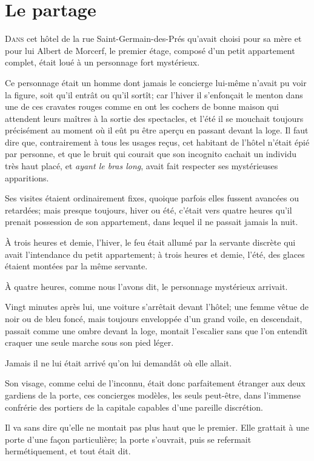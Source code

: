 \chapter{Le partage}

\lettrine{D}{ans} cet hôtel de la rue Saint-Germain-des-Prés qu'avait choisi pour sa mère et pour lui Albert de Morcerf, le premier étage, composé d'un petit appartement complet, était loué à un personnage fort mystérieux. 

Ce personnage était un homme dont jamais le concierge lui-même n'avait pu voir la figure, soit qu'il entrât ou qu'il sortît; car l'hiver il s'enfonçait le menton dans une de ces cravates rouges comme en ont les cochers de bonne maison qui attendent leurs maîtres à la sortie des spectacles, et l'été il se mouchait toujours précisément au moment où il eût pu être aperçu en passant devant la loge. Il faut dire que, contrairement à tous les usages reçus, cet habitant de l'hôtel n'était épié par personne, et que le bruit qui courait que son incognito cachait un individu très haut placé, et \textit{ayant le bras long}, avait fait respecter ses mystérieuses apparitions. 

Ses visites étaient ordinairement fixes, quoique parfois elles fussent avancées ou retardées; mais presque toujours, hiver ou été, c'était vers quatre heures qu'il prenait possession de son appartement, dans lequel il ne passait jamais la nuit. 

À trois heures et demie, l'hiver, le feu était allumé par la servante discrète qui avait l'intendance du petit appartement; à trois heures et demie, l'été, des glaces étaient montées par la même servante. 

À quatre heures, comme nous l'avons dit, le personnage mystérieux arrivait. 

Vingt minutes après lui, une voiture s'arrêtait devant l'hôtel; une femme vêtue de noir ou de bleu foncé, mais toujours enveloppée d'un grand voile, en descendait, passait comme une ombre devant la loge, montait l'escalier sans que l'on entendît craquer une seule marche sous son pied léger. 

Jamais il ne lui était arrivé qu'on lui demandât où elle allait. 

Son visage, comme celui de l'inconnu, était donc parfaitement étranger aux deux gardiens de la porte, ces concierges modèles, les seuls peut-être, dans l'immense confrérie des portiers de la capitale capables d'une pareille discrétion. 

Il va sans dire qu'elle ne montait pas plus haut que le premier. Elle grattait à une porte d'une façon particulière; la porte s'ouvrait, puis se refermait hermétiquement, et tout était dit. 


